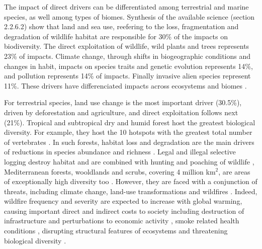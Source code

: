 The impact of direct drivers can be differentiated among terrestrial and marine species, as well among types of biomes.  Synthesis of the available science \citep{ipbes_2022_6417333} (section 2.2.6.2) show that land and sea use, reefering to the loss, fragmentation and degradation of wildlife habitat are responsible for 30\% of the impacts on biodiversity. The direct exploitation of wildlife, wild plants and trees represents 23\% of impacts. Climate change, through shifts in biogeographic conditions and changes in habit, impacts on species traits and genetic evolution represents 14\%, and pollution represents 14\% of impacts. Finally invasive alien species represent 11\%. These drivers have differenciated impacts across ecosystems and biomes \citep{ipbes_2022_6417333}. 

For terrestrial species, land use change is the most important driver (30.5\%), driven by deforestation and agriculture, and direct exploitation follows next (21\%). 
Tropical and subtropical dry and humid forest host the greatest biological diversity. For example, they host the 10 hotspots with the greatest total number of vertebrates \citep{mittermeier_global_2011}. In such forests, habitat loss and degradation are the main drivers of reductions in species abundance and richness \citep{newbold_global_2014}. Legal and illegal selective logging destroy habitat \citep{hoare2022establishing,  bousfield_2023_large} and are combined with hunting and poaching of wildlife \citep{gallego_2020_combined}, 
 Mediterranean forests, wooldlands and scrubs, covering 4 million km$^2$, are areas of exceptionally high diversity too \citep{Mooney2001, blondel_2010}. However, they are faced with a conjunction of threats, including climate change, land-use transformations \citep{newbold_tropical_2020} and wildfires \citep{Dupuy2019ClimateCI}. Indeed, wildfire frequency and severity are expected to increase with global warming, causing important direct and indirect costs to society including destruction of infrastructure and perturbations to economic activity \citep{wang_economic_2021}, smoke related health conditions \citep{burke_wildfire_2023, heft-neal_behavior_2023}, disrupting structural features of ecosystems \citep{Ayars2023} and threatening biological diversity \citep{Wintle2020}.

